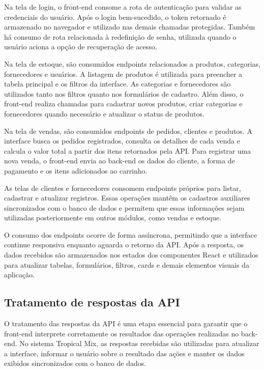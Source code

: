 Na tela de login, o front-end consome a rota de autenticação para validar as credenciais do usuário. Após o login bem-sucedido, o token retornado é armazenado no navegador e utilizado nas demais chamadas protegidas. Também há consumo de rota relacionada à redefinição de senha, utilizada quando o usuário aciona a opção de recuperação de acesso.

Na tela de estoque, são consumidos endpoints relacionados a produtos, categorias, fornecedores e usuários. A listagem de produtos é utilizada para preencher a tabela principal e os filtros da interface. As categorias e fornecedores são utilizados tanto nos filtros quanto nos formulários de cadastro. Além disso, o front-end realiza chamadas para cadastrar novos produtos, criar categorias e fornecedores quando necessário e atualizar o status de produtos.

Na tela de vendas, são consumidos endpoints de pedidos, clientes e produtos. A interface busca os pedidos registrados, consulta os detalhes de cada venda e calcula o valor total a partir dos itens retornados pela API. Para registrar uma nova venda, o front-end envia ao back-end os dados do cliente, a forma de pagamento e os itens adicionados ao carrinho.

As telas de clientes e fornecedores consomem endpoints próprios para listar, cadastrar e atualizar registros. Essas operações mantêm os cadastros auxiliares sincronizados com o banco de dados e permitem que essas informações sejam utilizadas posteriormente em outros módulos, como vendas e estoque.

O consumo dos endpoints ocorre de forma assíncrona, permitindo que a interface continue responsiva enquanto aguarda o retorno da API. Após a resposta, os dados recebidos são armazenados nos estados dos componentes React e utilizados para atualizar tabelas, formulários, filtros, cards e demais elementos visuais da aplicação.

\subsection{Tratamento de respostas da API}

O tratamento das respostas da API é uma etapa essencial para garantir que o front-end interprete corretamente os resultados das operações realizadas no back-end. No sistema Tropical Mix, as respostas recebidas são utilizadas para atualizar a interface, informar o usuário sobre o resultado das ações e manter os dados exibidos sincronizados com o banco de dados.

